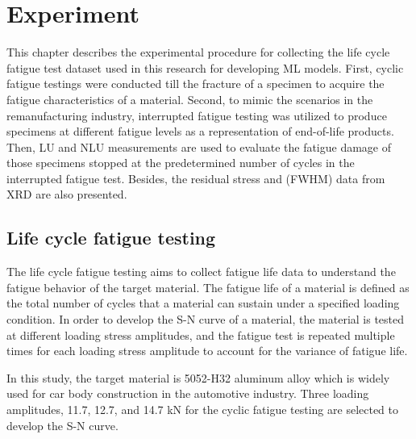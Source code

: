 \chapter{Experiment}
\label{chap: exper}
This chapter describes the experimental procedure for collecting the life cycle fatigue test dataset used in this research for developing ML models. First, cyclic fatigue testings were conducted till the fracture of a specimen to acquire the fatigue characteristics of a material. Second, to mimic the scenarios in the remanufacturing industry, interrupted fatigue testing was utilized to produce specimens at different fatigue levels as a representation of end-of-life products. Then, LU and NLU measurements are used to evaluate the fatigue damage of those specimens stopped at the predetermined number of cycles in the interrupted fatigue test. Besides, the residual stress and (FWHM) data from XRD are also presented.

\section{Life cycle fatigue testing}
The life cycle fatigue testing aims to collect fatigue life data to understand the fatigue behavior of the target material. The fatigue life of a material is defined as the total number of cycles that a material can sustain under a specified loading condition. In order to develop the S-N curve of a material, the material is tested at different loading stress amplitudes, and the fatigue test is repeated multiple times for each loading stress amplitude to account for the variance of fatigue life.

In this study, the target material is 5052-H32 aluminum alloy which is widely used for car body construction in the automotive industry. 
Three loading amplitudes, 11.7, 12.7, and 14.7 kN for the cyclic fatigue testing are selected to develop the S-N curve.


